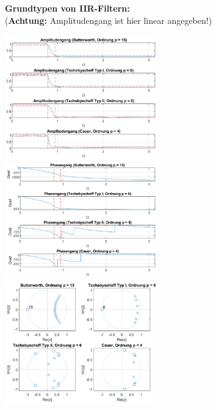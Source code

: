 \documentclass[10pt,a4paper]{article}
\begin{document}
\textbf{Grundtypen von IIR-Filtern:}\\
(\textbf{Achtung: } Amplitudengang ist hier linear angegeben!)
\begin{center}
      \includegraphics[width=0.50\textwidth]{./img/IIR_Filtertypen_Amplitudengang.png}
      \includegraphics[width=0.50\textwidth]{./img/IIR_Filtertypen_Phasengang.png}
      \includegraphics[width=0.50\textwidth]{./img/IIR_Filtertypen_Pol_NST.png}
\end{center}
\end{document}
